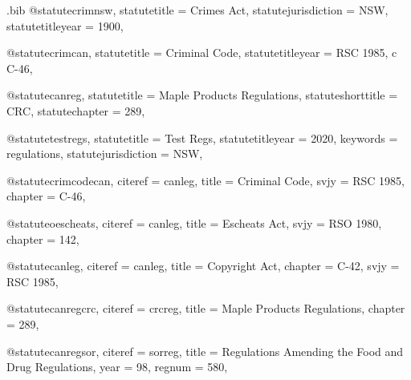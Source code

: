 \begin{filecontents*}[overwrite]{\jobname.bib}
@statute{crimnsw,
statutetitle = {Crimes Act},
statutejurisdiction = {NSW},
statutetitleyear = {1900},%
}


@statute{crimcan,
statutetitle = {Criminal Code},
statutetitleyear = {RSC 1985, c C-46},%
}


@statute{canreg,
statutetitle = {Maple Products Regulations},
statuteshorttitle = {CRC},
statutechapter = {289},
}

@statute{testregs,
statutetitle = {Test Regs},
statutetitleyear = {2020},%
keywords = {regulations},
statutejurisdiction = {NSW},
}




@statute{crimcodecan,
citeref = {canleg},
title = {Criminal Code},
svjy = {RSC 1985},
chapter = {C-46},
}


@statute{oescheats,
citeref = {canleg},
title = {Escheats Act},
svjy = {RSO 1980},
chapter = {142},
}

@statute{canleg,
citeref = {canleg},
title = {Copyright Act},
chapter = {C-42},
svjy = {RSC 1985},
}

@statute{canregcrc,
citeref = {crcreg},
title = {Maple Products Regulations},
chapter = {289},
}


@statute{canregsor,
citeref = {sorreg},
title = {Regulations Amending the Food and Drug Regulations},
year = {98},
regnum = {580},
}


\end{filecontents*}
